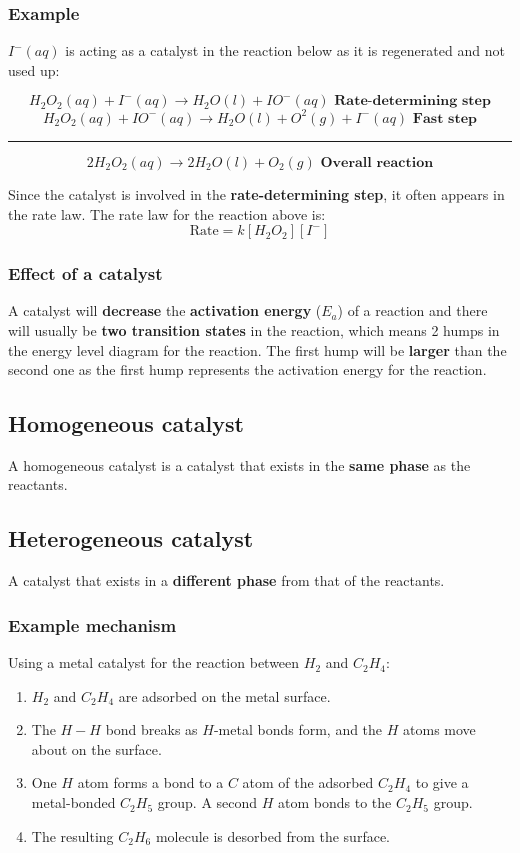 \documentclass[11pt]{article}
\begin{document}
\subsubsection{Example}
\label{sec:org7986cf6}
\(I^- (aq)\) is acting as a catalyst in the reaction below as it is regenerated and not used up:

\[H_2 O_2 (aq) + I^- (aq) \rightarrow H_2O (l) + IO^- (aq) \textbf{ Rate-determining step}\]
\[H_2 O_2 (aq) + IO^- (aq) \rightarrow H_2O (l) + O^2 (g) + I^- (aq) \textbf{ Fast step}\]
\hrule
\[2H_2O_2 (aq) \rightarrow 2H_2O (l) + O_2 (g) \textbf{ Overall reaction}\]


Since the catalyst is involved in the \textbf{rate-determining step}, it often appears in the rate law. The rate law for the reaction above is:
\[\text{Rate} = k[H_2O_2][I^-]\]
\subsubsection{Effect of a catalyst}
\label{sec:org7272ac9}
A catalyst will \textbf{decrease} the \textbf{activation energy} (\(E_a\)) of a reaction and there will usually be \textbf{two transition states} in the reaction, which means 2 humps in the energy level diagram for the reaction. The first hump will be \textbf{larger} than the second one as the first hump represents the activation energy for the reaction.
\subsection{Homogeneous catalyst}
\label{sec:org3f35395}
A homogeneous catalyst is a catalyst that exists in the \textbf{same phase} as the reactants.

\newpage
\subsection{Heterogeneous catalyst}
\label{sec:orgef98f4b}
A catalyst that exists in a \textbf{different phase} from that of the reactants.
\subsubsection{Example mechanism}
\label{sec:org8838ae9}
Using a metal catalyst for the reaction between \(H_2\) and \(C_2H_4\):

\begin{enumerate}
\item \(H_2\) and \(C_2H_4\) are adsorbed on the metal surface.
\item The \(H-H\) bond breaks as \(H\)-metal bonds form, and the \(H\) atoms move about on the surface.
\item One \(H\) atom forms a bond to a \(C\) atom of the adsorbed \(C_2H_4\) to give a metal-bonded \(C_2H_5\) group. A second \(H\) atom bonds to the \(C_2H_5\) group.
\item The resulting \(C_2H_6\) molecule is desorbed from the surface.
\end{enumerate}
\end{document}
